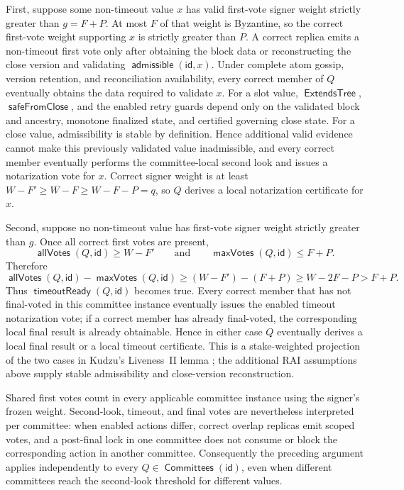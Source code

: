 \documentclass[sigplan,twocolumn,review,anonymous]{acmart}
\newcommand{\func}[1]{\operatorname{\mathsf{#1}}}
\newcommand{\allVotes}{\func{allVotes}}
\newcommand{\maxVotes}{\func{maxVotes}}
\newcommand{\id}{\mathsf{id}}
\newcommand{\admissible}{\func{admissible}}
\newcommand{\ExtendsTree}{\func{ExtendsTree}}
\newcommand{\Committees}{\func{Committees}}
\newcommand{\timeoutReady}{\func{timeoutReady}}
\newcommand{\safeFromClose}{\func{safeFromClose}}
\begin{document}
First, suppose some non-timeout value \(x\) has valid first-vote signer weight strictly greater than
\(g=F+P\).  At most \(F\) of that weight is Byzantine, so the correct first-vote weight supporting
\(x\) is strictly greater than \(P\).  A correct replica emits a non-timeout first vote only after
obtaining the block data or reconstructing the close version and validating \(\admissible(\id,x)\).
Under complete atom gossip, version retention, and reconciliation availability, every correct member of
\(Q\) eventually obtains the data required to validate \(x\).  For a slot value, \(\ExtendsTree\),
\(\safeFromClose\), and the enabled retry guards depend only on the validated block and ancestry,
monotone finalized state, and certified governing close state.  For a close value, admissibility is
stable by definition.  Hence additional valid evidence cannot make this previously validated value
inadmissible, and every correct member eventually performs the committee-local second look and issues a
notarization vote for \(x\).  Correct signer weight is at least \(W-F'\ge W-F\ge W-F-P=q\), so
\(Q\) derives a local notarization certificate for \(x\).

Second, suppose no non-timeout value has first-vote signer weight strictly greater than \(g\).  Once all
correct first votes are present,
\[
\allVotes(Q,\id)\ge W-F'
\qquad\text{and}\qquad
\maxVotes(Q,\id)\le F+P.
\]
Therefore
\[
\allVotes(Q,\id)-\maxVotes(Q,\id)
\ge (W-F')-(F+P)
\ge W-2F-P
>F+P.
\]
Thus \(\timeoutReady(Q,\id)\) becomes true.  Every correct member that has not final-voted in this
committee instance eventually issues the enabled timeout notarization vote; if a correct member has
already final-voted, the corresponding local final result is already obtainable.  Hence in either case
\(Q\) eventually derives a local final result or a local timeout certificate.  This is a
stake-weighted projection of the two cases in Kudzu's Liveness~II lemma
\cite[Lemma~5.10]{shoup2025kudzu}; the additional RAI assumptions above supply stable admissibility and
close-version reconstruction.

Shared first votes count in every applicable committee instance using the signer's frozen weight.
Second-look, timeout, and final votes are nevertheless interpreted per committee: when enabled actions
differ, correct overlap replicas emit scoped votes, and a post-final lock in one committee does not
consume or block the corresponding action in another committee.  Consequently the preceding argument
applies independently to every \(Q\in\Committees(\id)\), even when different committees reach the
second-look threshold for different values.
\end{document}

